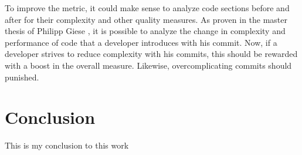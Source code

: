 To improve the metric, it could make sense to analyze code sections
before and after for their complexity and other quality measures.
As proven in the master thesis of Philipp Giese \cite{pg:2014},
it is possible to analyze the change in complexity and performance
of code that a developer introduces with his commit.
Now, if a developer strives to reduce complexity with his commits,
this should be rewarded with a boost in the overall measure.
Likewise, overcomplicating commits should punished.

\section{Conclusion}

This is my conclusion to this work